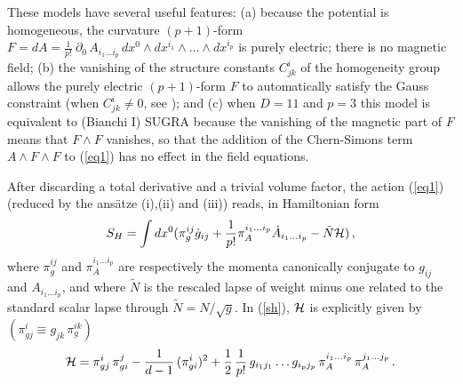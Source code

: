 \documentclass[a4paper,12pt]{article}
\begin{document}
These models have several useful features: (a) because
the potential is homogeneous, the 
curvature $(p+1)$-form $F = dA = \frac{1}{p!} \ \partial_0 \,
A_{i_1 \ldots i_p} \, dx^0 \wedge dx^{i_1} \wedge \ldots \wedge
dx^{i_p}$  is purely electric;
there is no magnetic field;
(b) the vanishing of the 
structure constants $C_{jk}^i$ of the homogeneity group allows the 
purely electric $(p+1)$-form $F$
to automatically satisfy the Gauss constraint (when 
$C_{jk}^i \ne 0$, see \cite{Demaretetal}); and (c) when $D=11$ and 
$p=3$ this 
model is equivalent to (Bianchi I) SUGRA because the vanishing of the 
magnetic part of $F$ means that $F \wedge F$ vanishes,
so that the addition of the Chern-Simons term 
$A \wedge F \wedge F$ to (\ref{eq1}) has no effect in the field 
equations.

After discarding a total derivative and a trivial volume factor, the 
action (\ref{eq1}) (reduced by the ans\"atze (i),(ii) and (iii))
reads, in Hamiltonian form
\begin{equation}
S_H = \int d x^0 (\pi_g^{ij} \dot{g}_{ij}
+ \frac{1}{p!} \pi_A^{i_1 \ldots i_p} \dot{A}_{i_1 \ldots i_p}
- \tilde{N} {\cal H}) \, ,
\label{sh}
\end{equation}
where $\pi_g^{ij}$ and $\pi_A^{i_1 \ldots i_p}$ are respectively the momenta canonically
conjugate to $g_{ij}$ and $A_{i_1
\ldots i_p}$, and where $\tilde{N}$ is the rescaled lapse of weight
minus one related to the standard scalar lapse through $\tilde{N}
= N/\sqrt{g}$.
In (\ref{sh}), ${\cal H}$ is explicitly given by
$(\pi_{gj}^i \equiv g_{jk} \, \pi_g^{ik})$
\begin{equation}
{\cal H} =  \pi_{gj}^i \,
\pi_{gi}^j - \frac{1}{d-1} \, (\pi_{gi}^i)^2 + \frac{1}{2} \,
\frac{1}{p!} \, g_{i_1 j_1} \ldots g_{i_p j_p} \, \pi_A^{i_1 \ldots
i_p} \, \pi_A^{j_1 \ldots j_p} \, . \label{eq14}
\end{equation}   
\end{document}
